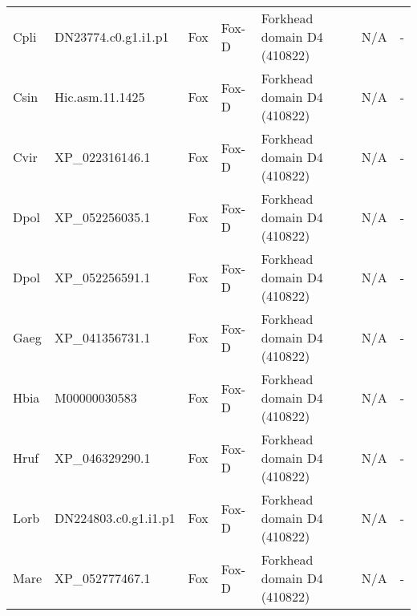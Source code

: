 \documentclass[../main.tex]{subfiles}
\begin{document}
\begin{landscape}
\begin{longtable}{lllllll}
		Cpli           & DN23774.c0.g1.i1.p1   & Fox            & Fox-D               & Forkhead domain D4 (410822)                 & N/A                                                                    & -                    \\
		Csin           & Hic.asm.11.1425       & Fox            & Fox-D               & Forkhead domain D4 (410822)                 & N/A                                                                    & -                    \\
		Cvir           & XP\_022316146.1       & Fox            & Fox-D               & Forkhead domain D4 (410822)                 & N/A                                                                    & -                    \\
		Dpol           & XP\_052256035.1       & Fox            & Fox-D               & Forkhead domain D4 (410822)                 & N/A                                                                    & -                    \\
		Dpol           & XP\_052256591.1       & Fox            & Fox-D               & Forkhead domain D4 (410822)                 & N/A                                                                    & -                    \\
		Gaeg           & XP\_041356731.1       & Fox            & Fox-D               & Forkhead domain D4 (410822)                 & N/A                                                                    & -                    \\
		Hbia           & M00000030583          & Fox            & Fox-D               & Forkhead domain D4 (410822)                 & N/A                                                                    & -                    \\
		Hruf           & XP\_046329290.1       & Fox            & Fox-D               & Forkhead domain D4 (410822)                 & N/A                                                                    & -                    \\
		Lorb           & DN224803.c0.g1.i1.p1  & Fox            & Fox-D               & Forkhead domain D4 (410822)                 & N/A                                                                    & -                    \\
		Mare           & XP\_052777467.1       & Fox            & Fox-D               & Forkhead domain D4 (410822)                 & N/A                                                                    & -                    \\

\end{longtable}
\end{landscape}
\end{document}
